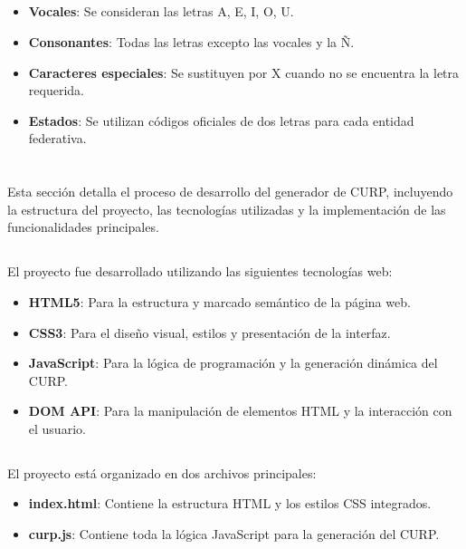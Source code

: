 \documentclass[10pt,a4paper]{article}
\begin{document}
\subsection{\color{colorESCOM}{Reglas de Construcción}}
\begin{itemize}
	\item \textbf{Vocales}: Se consideran las letras A, E, I, O, U.
	\item \textbf{Consonantes}: Todas las letras excepto las vocales y la Ñ.
	\item \textbf{Caracteres especiales}: Se sustituyen por X cuando no se encuentra la letra requerida.
	\item \textbf{Estados}: Se utilizan códigos oficiales de dos letras para cada entidad federativa.
\end{itemize}

\pagebreak

\section{\color{colorIPN}{Desarrollo}}
Esta sección detalla el proceso de desarrollo del generador de CURP, incluyendo la estructura del proyecto, las tecnologías utilizadas y la implementación de las funcionalidades principales.

\subsection{\color{colorESCOM}{Tecnologías Utilizadas}}
El proyecto fue desarrollado utilizando las siguientes tecnologías web:
\begin{itemize}
	\item \textbf{HTML5}: Para la estructura y marcado semántico de la página web.
	\item \textbf{CSS3}: Para el diseño visual, estilos y presentación de la interfaz.
	\item \textbf{JavaScript}: Para la lógica de programación y la generación dinámica del CURP.
	\item \textbf{DOM API}: Para la manipulación de elementos HTML y la interacción con el usuario.
\end{itemize}

\subsection{\color{colorESCOM}{Estructura del Proyecto}}
El proyecto está organizado en dos archivos principales:
\begin{itemize}
	\item \textbf{index.html}: Contiene la estructura HTML y los estilos CSS integrados.
	\item \textbf{curp.js}: Contiene toda la lógica JavaScript para la generación del CURP.
\end{itemize}
\end{document}
